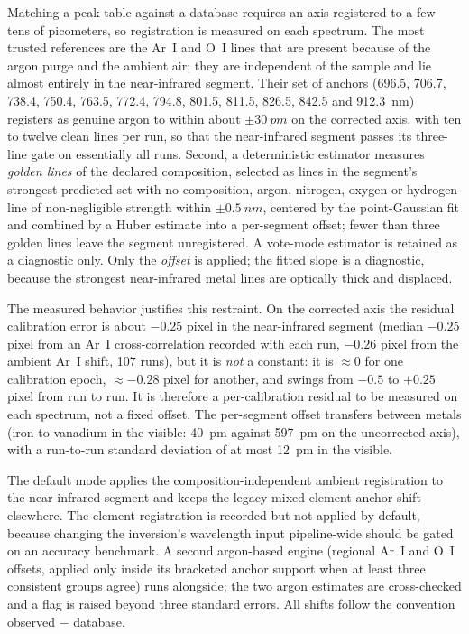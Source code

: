 Matching a peak table against a database requires an axis registered to a few tens of picometers, so registration is measured on each spectrum.
The most trusted references are the Ar~I and O~I lines that are present because of the
argon purge and the ambient air; they are independent of the sample and lie almost
entirely in the near-infrared segment.
Their set of anchors (696.5, 706.7, 738.4, 750.4, 763.5, 772.4, 794.8, 801.5, 811.5, 826.5,
842.5 and \SI{912.3}{nm}) registers as genuine argon to within about $\pm\SI{30}{pm}$ on
the corrected axis, with ten to twelve clean lines per run, so that the near-infrared segment
passes its three-line gate on essentially all runs.
Second, a deterministic estimator measures \emph{golden lines} of the declared composition,
selected as lines in the segment's strongest predicted set with no composition, argon,
nitrogen, oxygen or hydrogen line of non-negligible strength within $\pm\SI{0.5}{nm}$,
centered by the point-Gaussian fit and combined by a Huber estimate into a per-segment
offset; fewer than three golden lines leave the segment unregistered.
A vote-mode estimator is retained as a diagnostic only. Only the \emph{offset} is applied; the fitted slope is a diagnostic, because the strongest near-infrared metal lines are optically thick and displaced.

The measured behavior justifies this restraint.
On the corrected axis the residual calibration error is about $-0.25$ pixel in the
near-infrared segment (median $-0.25$ pixel from an Ar~I cross-correlation recorded with each run, $-0.26$ pixel
from the ambient Ar~I shift, 107 runs), but it is \emph{not} a constant: it is $\approx 0$
for one calibration epoch, $\approx -0.28$ pixel for another, and swings from $-0.5$ to $+0.25$
pixel from run to run.
It is therefore a per-calibration residual to be measured on each spectrum, not a fixed
offset.
The per-segment offset transfers between metals (iron to vanadium in the visible: \SI{40}{pm} against \SI{597}{pm} on the uncorrected axis), with a run-to-run standard deviation of at most \SI{12}{pm} in the visible.

The default mode applies the composition-independent ambient registration to the near-infrared segment and keeps the legacy mixed-element anchor shift elsewhere. The element registration is recorded but not applied by default, because changing the inversion's wavelength input pipeline-wide should be gated on an accuracy benchmark.
A second argon-based engine (regional Ar~I and O~I offsets, applied only inside its bracketed anchor support when at least three consistent groups agree) runs alongside; the two argon estimates are cross-checked and a flag is raised beyond three standard errors.
All shifts follow the convention observed $-$ database.

